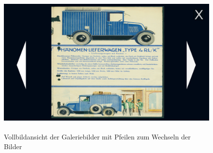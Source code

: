 %
\begin{figure}[htp]
	\centering
	\includegraphics[width=0.9\linewidth]{images/gallery}
	\caption[gallery]{\\Vollbildansicht der Galeriebilder mit Pfeilen zum Wechseln der Bilder}
	\label{fig:gallery}
\end{figure}
%
